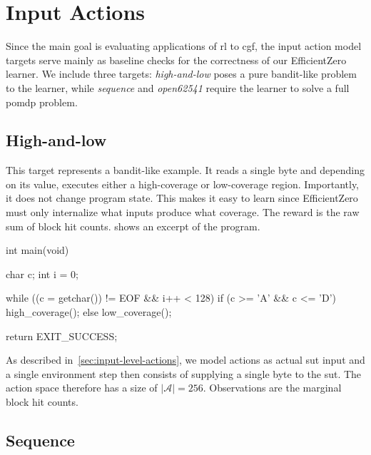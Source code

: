 
\section{Input Actions}\label{sec:targets-input-actions}

Since the main goal is evaluating applications of \gls{rl} to \gls{cgf}, the input
action model targets serve mainly as baseline checks for the correctness of our
EfficientZero learner.
We include three targets: \emph{high-and-low} poses a pure bandit-like problem to the learner,
while \emph{sequence} and \emph{open62541} require the learner to solve a full \gls{pomdp} problem.

\subsection{High-and-low}\label{sec:target-high-and-low}

This target represents a bandit-like example.
It reads a single byte and depending on its value, executes either a high-coverage
or low-coverage region.
Importantly, it does not change program state.
This makes it easy to learn since EfficientZero must only internalize what inputs
produce what coverage.
The reward is the raw sum of block hit counts.
 shows an excerpt of the program.

\begin{ccode}[float=htbp,
  caption={[The \emph{high-and-low} target]%
    An excerpt of the \emph{high-and-low} target.
    Each byte selects either a high- or low-coverage function without changing
    program state. The loop is bounded at 128 iterations.},
  label={lst:target-high-and-low}]
int main(void) {
    char c;
    int i = 0;

    while ((c = getchar()) != EOF && i++ < 128) {
        if (c >= 'A' && c <= 'D') {
            high_coverage();
        } else {
            low_coverage();
        }
    }

    return EXIT_SUCCESS;
}
\end{ccode}

As described in~\cref{sec:input-level-actions}, we model actions as actual \gls{sut} input
and a single environment step then consists of supplying a single byte to the \gls{sut}.
The action space therefore has a size of $\lvert\mathcal{A}\rvert=256$.
Observations are the marginal block hit counts.

\subsection{Sequence}\label{sec:target-sequence}

